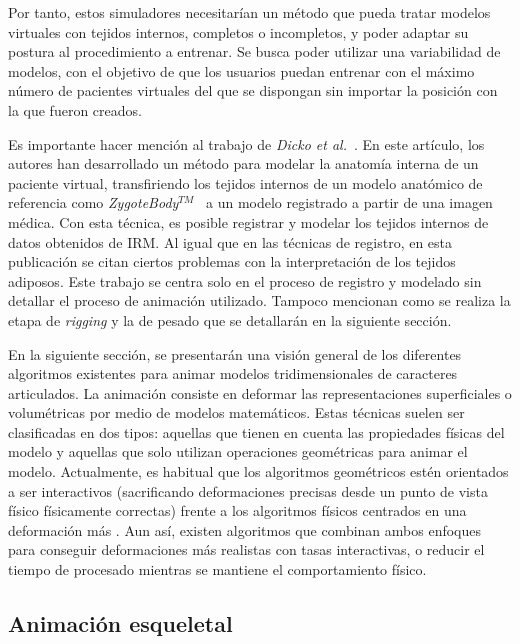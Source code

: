 Por tanto, estos simuladores necesitarían un método que pueda tratar modelos virtuales con tejidos internos, completos o incompletos, y poder adaptar su postura al procedimiento a entrenar. Se busca poder utilizar una variabilidad de modelos, con el objetivo de que los usuarios puedan entrenar con el máximo número de pacientes virtuales del que se dispongan sin importar la posición con la que fueron creados.

Es importante hacer mención al trabajo de  \emph{Dicko et al.}~\cite{Ali2013}.  En este artículo, los autores han desarrollado un método para modelar la anatomía interna de un paciente virtual, transfiriendo los tejidos internos de un modelo anatómico de referencia como \emph{ZygoteBody}$^{TM}$~\cite{kelc2012zygote} a un modelo registrado a partir de una imagen médica. Con esta técnica, es posible registrar y modelar los tejidos internos de datos obtenidos de \ac{IRM}. Al igual que en las técnicas de registro, en esta publicación se citan ciertos problemas con la interpretación de los tejidos adiposos. Este trabajo se centra solo en el proceso de registro y modelado sin detallar el proceso de animación utilizado. Tampoco mencionan como se realiza la etapa de \emph{rigging} y la de pesado que se detallarán en la siguiente sección.  


En la siguiente sección, se presentarán una visión general de los diferentes algoritmos existentes para animar modelos tridimensionales de caracteres articulados. La animación consiste en deformar las representaciones superficiales 
o volumétricas por medio de modelos matemáticos. Estas técnicas suelen ser clasificadas en dos tipos: aquellas que tienen en cuenta las propiedades físicas del modelo y aquellas que solo utilizan operaciones geométricas para animar el modelo. Actualmente, es habitual que los algoritmos geométricos estén orientados a ser interactivos (sacrificando deformaciones precisas desde un punto de vista físico físicamente correctas) frente a los algoritmos físicos centrados en una deformación más  . Aun así, existen algoritmos que combinan ambos enfoques para conseguir deformaciones más realistas con tasas interactivas, o reducir el tiempo de procesado mientras se mantiene el comportamiento físico. 


\subsection{Animación esqueletal}
\label{art:animation}
\label{art:virtualskel}

